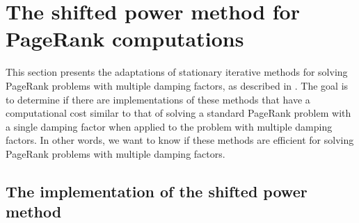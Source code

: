 
\section{The shifted power method for PageRank computations}
This section presents the adaptations of stationary iterative methods for solving PageRank problems with multiple damping factors, as described in \cite{SHEN2022126799}. The goal is to determine if there are implementations of these methods that have a computational cost similar to that of solving a standard PageRank problem with a single damping factor when applied to the problem with multiple damping factors. In other words, we want to know if these methods are efficient for solving PageRank problems with multiple damping factors.

\subsection{The implementation of the shifted power method}

